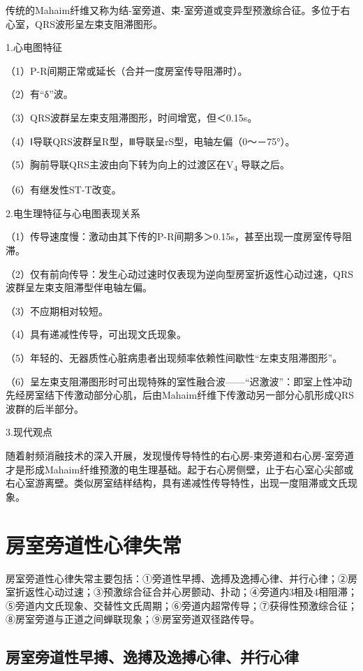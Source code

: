 传统的Mahaim纤维又称为结-室旁道、束-室旁道或变异型预激综合征。多位于右心室，QRS波形呈左束支阻滞图形。

1.心电图特征

（1）P-R间期正常或延长（合并一度房室传导阻滞时）。

（2）有“δ”波。

（3）QRS波群呈左束支阻滞图形，时间增宽，但＜0.15s。

（4）Ⅰ导联QRS波群呈R型，Ⅲ导联呈rS型，电轴左偏（0～－75°）。

（5）胸前导联QRS主波由向下转为向上的过渡区在V\textsubscript{4}
导联之后。

（6）有继发性ST-T改变。

2.电生理特征与心电图表现关系

（1）传导速度慢：激动由其下传的P-R间期多＞0.15s，甚至出现一度房室传导阻滞。

（2）仅有前向传导：发生心动过速时仅表现为逆向型房室折返性心动过速，QRS波群呈左束支阻滞型伴电轴左偏。

（3）不应期相对较短。

（4）具有递减性传导，可出现文氏现象。

（5）年轻的、无器质性心脏病患者出现频率依赖性间歇性“左束支阻滞图形”。

（6）呈左束支阻滞图形时可出现特殊的室性融合波------“迟激波”：即室上性冲动先经房室结下传激动部分心肌，后由Mahaim纤维下传激动另一部分心肌形成QRS波群的后半部分。

3.现代观点

随着射频消融技术的深入开展，发现慢传导特性的右心房-束旁道和右心房-室旁道才是形成Mahaim纤维预激的电生理基础。起于右心房侧壁，止于右心室心尖部或右心室游离壁。类似房室结样结构，具有递减性传导特性，出现一度阻滞或文氏现象。

\protect\hypertarget{text00036.htmlux5cux23subid421}{}{}

\section{房室旁道性心律失常}

房室旁道性心律失常主要包括：①旁道性早搏、逸搏及逸搏心律、并行心律；②房室折返性心动过速；③预激综合征合并心房颤动、扑动；④旁道内3相及4相阻滞；⑤旁道内文氏现象、交替性文氏周期；⑥旁道内超常传导；⑦获得性预激综合征；⑧房室旁道与正道之间蝉联现象；⑨房室旁道双径路传导。

\protect\hypertarget{text00036.htmlux5cux23subid422}{}{}

\subsection{房室旁道性早搏、逸搏及逸搏心律、并行心律}

